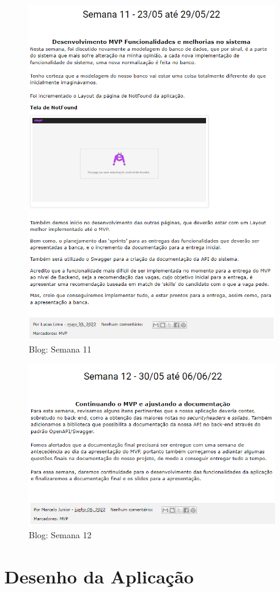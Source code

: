 \begin{apendicesenv}
\begin{figure}[H]
\end{figure}
\begin{figure}[H]
	\centering
	\caption{Blog: Semana 11}
	\includegraphics[width=0.95\textwidth]{../imagens/blog-posts/semana11.png}
\end{figure}
\begin{figure}[H]
	\centering
	\caption{Blog: Semana 12}
	\includegraphics[width=0.95\textwidth]{../imagens/blog-posts/semana12.png}
\end{figure}

\chapter{Desenho da Aplicação}


\end{apendicesenv}
